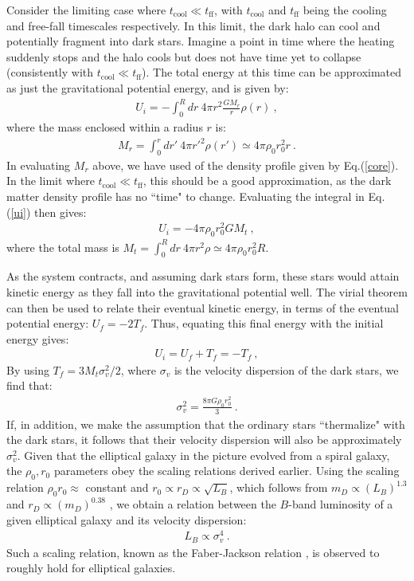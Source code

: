 \documentclass[12pt]{article}
\begin{document}
{{Consider the limiting case where $t _{\text{cool}} \ll t _{\text{ff}}$, with $t _{\text{cool}}$ and $t _{\text{ff}}$ being the cooling and free-fall timescales respectively. In this limit, the dark halo can cool and potentially fragment into dark stars. Imagine a point in time where the heating suddenly stops and the halo cools but does not have time yet to collapse (consistently with $t _{\text{cool}} \ll t _{\text{ff}}$). The total energy at this time can be approximated as just the gravitational potential energy, and is given by:
%
\begin{eqnarray}
U _i = -\int _0 ^R dr \ 4\pi r^2 \frac{GM_r}{r}\rho (r) \ ,
\label{ui}
\end{eqnarray}
%
where the mass enclosed within a radius $r$ is:
%
\begin{eqnarray}
M_r = \int _0 ^r dr' \ 4\pi {r'} ^2\rho (r') \simeq 4\pi \rho _0r _0 ^2 r \ .
\end{eqnarray}
%
In evaluating $M_r$ above, we have used of the density profile given by Eq.(\ref{core}).  In the limit where $t _{\text{cool}} \ll t _{\text{ff}}$, this should be a good approximation, as the dark matter density profile has no ``time" to change. Evaluating the integral in Eq.(\ref{ui}) then gives:
%
\begin{eqnarray}
U _i = -4\pi \rho _0r _0 ^2 GM _t \ ,
\end{eqnarray}
%
where the total mass is $M _t = \int _0 ^R dr \ 4\pi r ^2 \rho \simeq 4\pi \rho _0r _0 ^2R$. 

As the system contracts, and assuming dark stars form, these stars would attain kinetic energy as they fall into the gravitational potential well. The virial theorem can then be used to relate their eventual kinetic energy, in terms of the eventual potential energy: $U _f = -2T _f$. Thus, equating this final energy with the initial energy gives:
%
\begin{eqnarray}
U _i = U _f + T _f = -T _f \ ,
\end{eqnarray}
%
By using $T _f = 3M _t\sigma _v ^2/2$, where $\sigma_v$ is the velocity dispersion of the dark stars, we find that:
\begin{eqnarray}
\sigma _v ^2 = \frac{8\pi G\rho _0r _0 ^2}{3} \ .
\end{eqnarray}
%
If, in addition, we make the assumption that the ordinary stars ``thermalize" with the dark stars, it follows that their velocity dispersion will also be approximately $\sigma _v ^2$. Given that the elliptical galaxy in the picture evolved from a spiral galaxy, the $\rho_0, r_0$ parameters obey the scaling relations derived earlier. Using the scaling relation $\rho _0r _0 \approx$ constant and $r _0 \propto r _D \propto \sqrt{L _B}$, which follows from $m _D \propto \left ( L _B \right ) ^{1.3}$ \cite{shankar} and $r_D \propto \left ( m _D \right ) ^{0.38}$ \cite{saluccird}, we obtain a relation between the $B$-band luminosity of a given elliptical galaxy and its velocity dispersion:
%
\begin{eqnarray}
L _B \propto \sigma _v ^4 \ .
\end{eqnarray}
%
Such a scaling relation, known as the Faber-Jackson relation \cite{faberjackson}, is observed to roughly hold for elliptical galaxies.

}}
\end{document}

